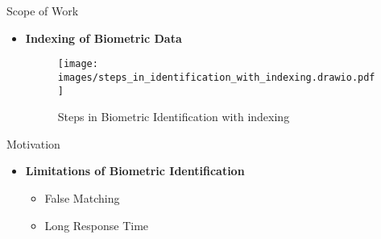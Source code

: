 \begin{frame}[t]{Scope of Work}
	\topline
    \begin{itemize}
    	\item \textcolor{navy_theme}{\textbf{Indexing of Biometric Data}}
    	\vspace{1em}
			\begin{figure}[!ht]
				\centering 
				\texttt{[image: images/steps\_in\_identification\_with\_indexing.drawio.pdf]}
				\caption{Steps in Biometric Identification with indexing}
				\label{fig:bio_indexing2}
			\end{figure}
	\end{itemize}
\end{frame}


\begin{frame}[t]{Motivation}
	\topline
    \begin{itemize}
    	\item<1> \textcolor{navy_theme}{\textbf{Limitations of Biometric Identification}}
		\vspace{1em}
		\begin{itemize}
			\setlength\itemsep{1em}

			\item False Matching

			\item Long Response Time
		\end{itemize}
		\vspace{1em}
	\end{itemize}
\end{frame}


